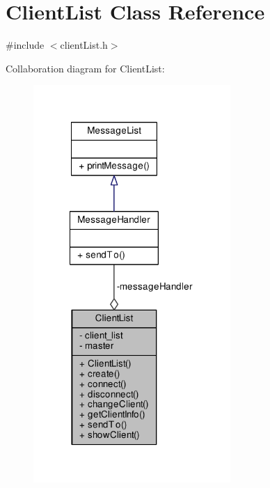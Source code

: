 \hypertarget{class_client_list}{}\section{Client\+List Class Reference}
\label{class_client_list}


{\ttfamily \#include $<$client\+List.\+h$>$}



Collaboration diagram for Client\+List\+:
\nopagebreak
\begin{figure}[H]
\begin{center}
\leavevmode
\includegraphics[width=212pt]{class_client_list__coll__graph}
\end{center}
\end{figure}
